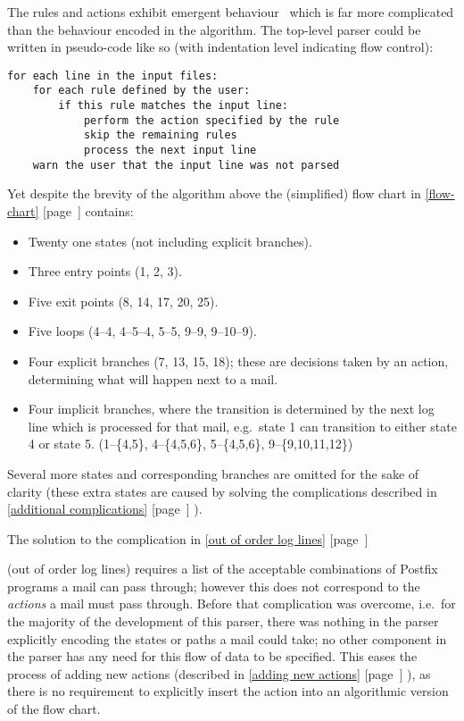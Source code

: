 \documentclass[a4paper,12pt,draft]{article}
\newcommand{\refwithpage}[1]{%
    \empty{}\ref{#1} [page~\pageref{#1}]%
}
\newcommand{\sectionref}[1]{%
    \textsection{}\refwithpage{#1}%
}
\begin{document}
\label{Emergent behaviour}

The rules and actions exhibit emergent behaviour~\cite{Wikipedia-Emergence}
which is far more complicated than the behaviour encoded in the algorithm.
The top-level parser could be written in pseudo-code like so (with
indentation level indicating flow control):

\begin{verbatim}
for each line in the input files:
    for each rule defined by the user:
        if this rule matches the input line:
            perform the action specified by the rule
            skip the remaining rules
            process the next input line
    warn the user that the input line was not parsed
\end{verbatim}

Yet despite the brevity of the algorithm above the (simplified) flow chart
in \sectionref{flow-chart} contains:

\begin{itemize}

    \item Twenty one states (not including explicit branches).

    \item Three entry points (1, 2, 3).

    \item Five exit points (8, 14, 17, 20, 25).

    \item Five loops (4--4, 4--5--4, 5--5, 9--9, 9--10--9).

    \item Four explicit branches (7, 13, 15, 18); these are decisions taken
        by an action, determining what will happen next to a mail.

    \item Four implicit branches, where the transition is determined by the
        next log line which is processed for that mail, e.g.\ state 1 can
        transition to either state 4 or state 5.  (1--\{4,5\},
        4--\{4,5,6\}, 5--\{4,5,6\}, 9--\{9,10,11,12\})

\end{itemize}

Several more states and corresponding branches are omitted for the sake of
clarity (these extra states are caused by solving the complications
described in \sectionref{additional complications}).

The solution to the complication in \sectionref{out of order log lines}
(out of order log lines) requires a list of the acceptable combinations of
Postfix programs a mail can pass through; however this does not correspond
to the \textit{actions\/} a mail must pass through.  Before that
complication was overcome, i.e.\ for the majority of the development of
this parser, there was nothing in the parser explicitly encoding the states
or paths a mail could take; no other component in the parser has any need
for this flow of data to be specified.  This eases the process of adding
new actions (described in \sectionref{adding new actions}), as there is no
requirement to explicitly insert the action into an algorithmic version of
the flow chart.
\end{document}
